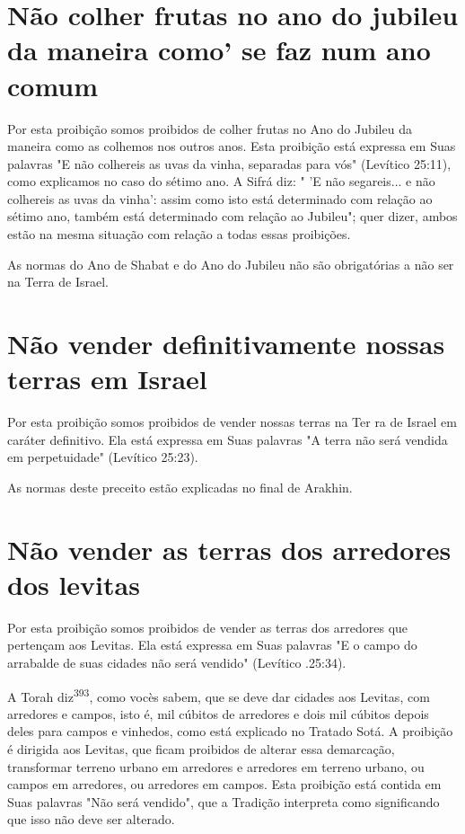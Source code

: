 \begin{itemize}
\begin{enumrate}
\begin{itemize}
\begin{itemize}
\begin{itemize}
\section{Não colher frutas no ano do jubileu da maneira como' se faz num ano comum}

Por esta proibição somos proibidos de colher frutas no Ano do Jubileu da
maneira como as colhemos nos outros anos. Esta proibição está expressa
em Suas palavras "E não colhereis as uvas da vinha, separadas para vós"
(Levítico 25:11), como explicamos no caso do sétimo ano. A Sifrá diz: "
'E não segareis... e não colhereis as uvas da vinha': assim como isto
está determinado com relação ao sétimo ano, também está determinado com
rela­ção ao Jubileu"; quer dizer, ambos estão na mesma situação com
relação a todas essas proibições.


As normas do Ano de Shabat e do Ano do Jubileu não são obrigató­rias a
não ser na Terra de Israel.


\section{Não vender definitivamente nossas terras em Israel}


Por esta proibição somos proibidos de vender nossas terras na Ter ra de
Israel em caráter definitivo. Ela está expressa em Suas palavras "A
terra não será vendida em perpetuidade" (Levítico 25:23).

As normas deste preceito estão explicadas no final de Arakhin.

\section{Não vender as terras dos arredores dos levitas}

Por esta proibição somos proibidos de vender as terras dos arredo­res
que pertençam aos Levitas. Ela está expressa em Suas palavras "E o campo
do arrabalde de suas cidades não será vendido" (Levítico .25:34).

A Torah diz\textsuperscript{393}, como vocès sabem, que se deve dar
cidades aos Le­vitas, com arredores e campos, isto é, mil cúbitos de
arredores e dois mil cúbi­tos depois deles para campos e vinhedos, como
está explicado no Tratado So­tá. A proibição é dirigida aos Levitas, que
ficam proibidos de alterar essa de­marcação, transformar terreno urbano
em arredores e arredores em terreno ur­bano, ou campos em arredores, ou
arredores em campos. Esta proibição está contida em Suas palavras "Não
será vendido", que a Tradição interpreta como significando que isso não
deve ser alterado.


\end{itemize}
\end{itemize}
\end{itemize}
\end{enumrate}
\end{itemize}
